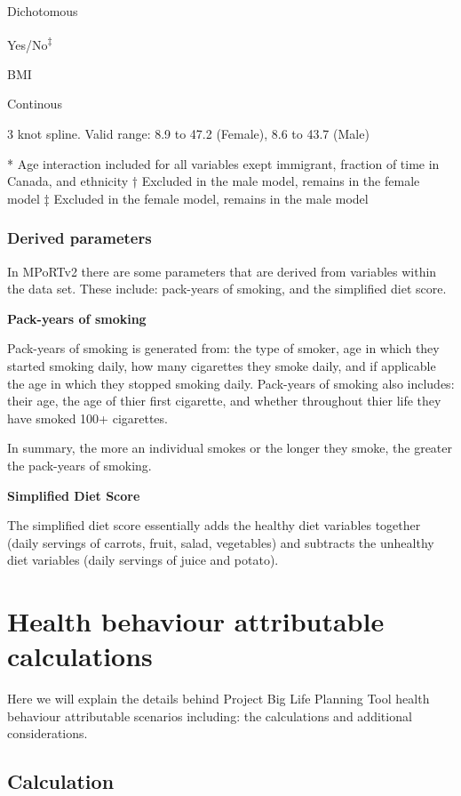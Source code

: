 \documentclass[]{book}
\begin{document}
Dichotomous

Yes/No\textsuperscript{‡}

BMI

Continous

3 knot spline. Valid range: 8.9 to 47.2 (Female), 8.6 to 43.7 (Male)

* Age interaction included for all variables exept immigrant, fraction
of time in Canada, and ethnicity † Excluded in the male model, remains
in the female model ‡ Excluded in the female model, remains in the male
model

\subsection{Derived parameters}\label{derived-parameters}

In MPoRTv2 there are some parameters that are derived from variables
within the data set. These include: pack-years of smoking, and the
simplified diet score.

\textbf{Pack-years of smoking}

Pack-years of smoking is generated from: the type of smoker, age in
which they started smoking daily, how many cigarettes they smoke daily,
and if applicable the age in which they stopped smoking daily.
Pack-years of smoking also includes: their age, the age of thier first
cigarette, and whether throughout thier life they have smoked 100+
cigarettes.

In summary, the more an individual smokes or the longer they smoke, the
greater the pack-years of smoking.

\textbf{Simplified Diet Score}

The simplified diet score essentially adds the healthy diet variables
together (daily servings of carrots, fruit, salad, vegetables) and
subtracts the unhealthy diet variables (daily servings of juice and
potato).

\chapter{Health behaviour attributable
calculations}\label{health-behaviour-attributable-calculations}

Here we will explain the details behind Project Big Life Planning Tool
health behaviour attributable scenarios including: the calculations and
additional considerations.

\section{Calculation}\label{calculation}
\end{document}
